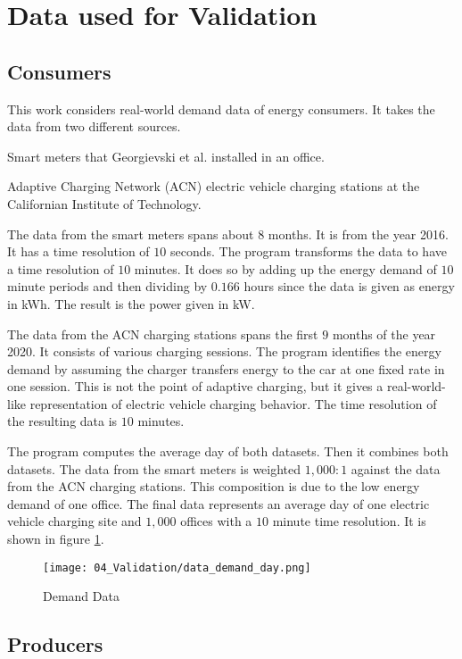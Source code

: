 \section{Data used for Validation}
\label{validation:data}

\subsection{Consumers}

This work considers real-world demand data of energy consumers.
It takes the data from two different sources.
\begin{enumerate*}
  \item Smart meters that Georgievski et al. \cite{Georgievski2012} installed in an office.
  \item Adaptive Charging Network (ACN) electric vehicle charging stations at the Californian Institute of Technology. \cite{Lee2019, ACNCaltech2020}
\end{enumerate*}

The data from the smart meters spans about $8$ months.
It is from the year 2016.
It has a time resolution of $10$ seconds.
The program transforms the data to have a time resolution of $10$ minutes.
It does so by adding up the energy demand of $10$ minute periods and then dividing by $0.166$ hours since the data is given as energy in kWh.
The result is the power given in kW.

The data from the ACN charging stations spans the first $9$ months of the year 2020.
It consists of various charging sessions.
The program identifies the energy demand by assuming the charger transfers energy to the car at one fixed rate in one session.
This is not the point of adaptive charging, but it gives a real-world-like representation of electric vehicle charging behavior.
The time resolution of the resulting data is $10$ minutes.

The program computes the average day of both datasets.
Then it combines both datasets.
The data from the smart meters is weighted $1, 000 : 1$ against the data from the ACN charging stations.
This composition is due to the low energy demand of one office.
The final data represents an average day of one electric vehicle charging site and $1, 000$ offices with a $10$ minute time resolution.
It is shown in figure \ref{figure:data.demand.day}.

\begin{figure}
  \centering
  \texttt{[image: 04\_Validation/data\_demand\_day.png]}
  \caption{Demand Data}
  \label{figure:data.demand.day}
\end{figure}

\subsection{Producers}

